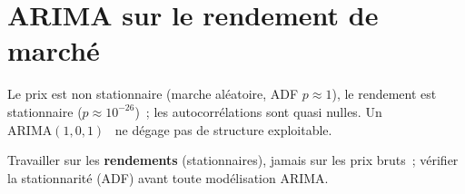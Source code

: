 \section{ARIMA sur le rendement de marché}
\label{sec:b3-arima}
Le prix est non stationnaire (marche aléatoire, ADF \(p\approx1\)), le
rendement est stationnaire (\(p\approx10^{-26}\))~; les autocorrélations
sont quasi nulles. Un \(\mathrm{ARIMA}(1,0,1)\)~\cite{boxjenkins1970} ne
dégage pas de structure exploitable.

\begin{conditions}
Travailler sur les \textbf{rendements} (stationnaires), jamais sur les
prix bruts~; vérifier la stationnarité (ADF) avant toute modélisation
ARIMA. %
\end{conditions}
